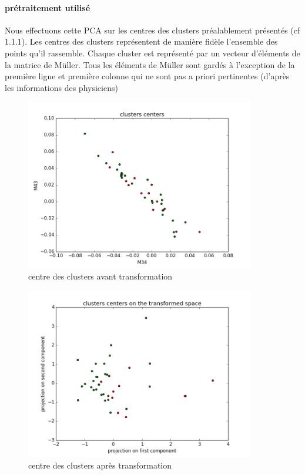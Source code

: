 \documentclass[a4paper,10pt]{report}
\begin{document}
\paragraph{prétraitement utilisé}
Nous effectuons cette PCA sur les centres des clusters préalablement présentés (cf 1.1.1). Les centres des clusters représentent de manière fidèle l'ensemble des points qu'il rassemble. Chaque cluster est représenté par un vecteur d'éléments de la matrice de Müller. Tous les éléments de Müller sont gardés à l’exception de la première ligne et première colonne qui ne sont pas a priori pertinentes (d'après les informations des physiciens)
\begin{figure}[htbp]
  \caption{centre des clusters avant transformation}
  \centering
  \includegraphics[width=10cm]{PCA_0.png}
\end{figure}
\begin{figure}[htbp]
  \caption{centre des clusters après transformation}
  \centering
  \includegraphics[width=10cm]{PCA_1.png}
\end{figure}
\end{document}
